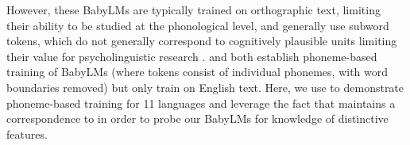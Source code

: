 
However, these BabyLMs are typically trained on orthographic text, limiting their ability to be studied at the phonological level, and generally use subword tokens, which do not generally correspond to cognitively plausible units \citep{beinborn-pinter-2023-analyzing} limiting their value for psycholinguistic research \citep{giulianelli-etal-2024-proper}. \citet{bunzeck2024graphemes} and \citet{goriely2024babble} both establish phoneme-based training of BabyLMs (where tokens consist of individual phonemes, with word boundaries removed) but only train on English text. Here, we use \ipachildes to demonstrate phoneme-based training for 11 languages and leverage the fact that \gpp maintains a correspondence to \phoible in order to probe our BabyLMs for knowledge of distinctive features. 


